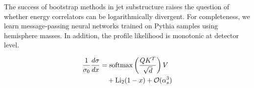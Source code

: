 The success of bootstrap methods in jet substructure raises the question
of whether energy correlators can be logarithmically divergent. For
completeness, we learn message-passing neural networks trained on Pythia
samples using hemisphere masses. In addition, the profile likelihood is
monotonic at detector level.

\begin{align}
  \frac{1}{\sigma_0} \frac{d\sigma}{dx} &= \mathrm{softmax}\left(\frac{Q K^T}{\sqrt{d}}\right) V \nonumber \\
  &\quad + \mathrm{Li}_{2}(1 - x) + \mathcal{O}(\alpha_s^3) \label{eq:5}
\end{align}

